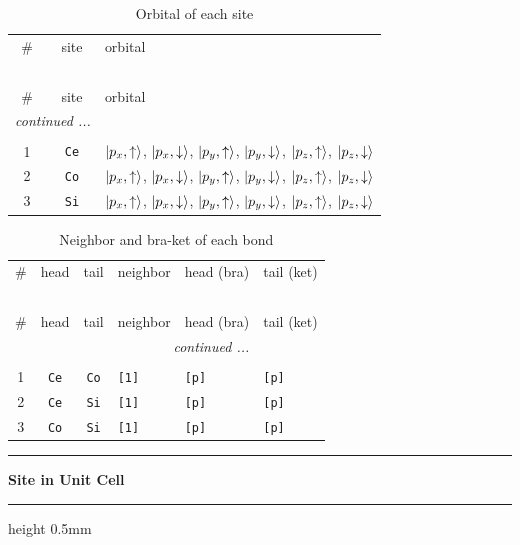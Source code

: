 \documentclass[fleqn,10pt,landscape]{jsarticle}
\begin{document}
\renewcommand{\arraystretch}{1.6}
\begin{longtable}[l]{ccl}
\captionsetup{justification=raggedright, singlelinecheck=off}
\caption{Orbital of each site}
 \\
 \hline \hline
\# & site & orbital \\ \hline \endfirsthead

\multicolumn{2}{l}{\tablename\ \thetable{}} \\
 \hline \hline
\# & site & orbital \\ \hline \endhead

 \hline \hline
\multicolumn{2}{r}{\footnotesize\it continued ...} \\ \endfoot

 \hline \hline
\multicolumn{2}{r}{} \\ \endlastfoot

1 & \texttt{Ce} & $\ket{p_{x},\uparrow}$, $\ket{p_{x},\downarrow}$, $\ket{p_{y},\uparrow}$, $\ket{p_{y},\downarrow}$, $\ket{p_{z},\uparrow}$, $\ket{p_{z},\downarrow}$ \\ \hline
2 & \texttt{Co} & $\ket{p_{x},\uparrow}$, $\ket{p_{x},\downarrow}$, $\ket{p_{y},\uparrow}$, $\ket{p_{y},\downarrow}$, $\ket{p_{z},\uparrow}$, $\ket{p_{z},\downarrow}$ \\ \hline
3 & \texttt{Si} & $\ket{p_{x},\uparrow}$, $\ket{p_{x},\downarrow}$, $\ket{p_{y},\uparrow}$, $\ket{p_{y},\downarrow}$, $\ket{p_{z},\uparrow}$, $\ket{p_{z},\downarrow}$ \\
\end{longtable}
\renewcommand{\arraystretch}{1.6}
\begin{longtable}[l]{ccclll}
\captionsetup{justification=raggedright, singlelinecheck=off}
\caption{Neighbor and bra-ket of each bond}
 \\
 \hline \hline
\# & head & tail & neighbor & head (bra) & tail (ket) \\ \hline \endfirsthead

\multicolumn{5}{l}{\tablename\ \thetable{}} \\
 \hline \hline
\# & head & tail & neighbor & head (bra) & tail (ket) \\ \hline \endhead

 \hline \hline
\multicolumn{5}{r}{\footnotesize\it continued ...} \\ \endfoot

 \hline \hline
\multicolumn{5}{r}{} \\ \endlastfoot

1 & \texttt{Ce} & \texttt{Co} & \texttt{[1]} & \texttt{[p]} & \texttt{[p]} \\ \hline
2 & \texttt{Ce} & \texttt{Si} & \texttt{[1]} & \texttt{[p]} & \texttt{[p]} \\ \hline
3 & \texttt{Co} & \texttt{Si} & \texttt{[1]} & \texttt{[p]} & \texttt{[p]} \\
\end{longtable}
\vspace{5mm}
\noindent \rule[0.5mm]{5mm}{0.5mm}\hspace{3mm}\textbf{Site in Unit Cell}\hspace{3mm}\leaders\hrule height 0.5mm\hfill\kern0pt
\vspace{3mm}
\end{document}
